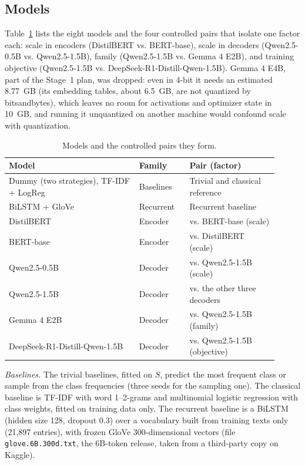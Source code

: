 \subsection{Models}
Table~\ref{tab:taxonomy2} lists the eight models and the four controlled pairs that isolate one factor each: scale in encoders (DistilBERT vs. BERT-base), scale in decoders (Qwen2.5-0.5B vs. Qwen2.5-1.5B), family (Qwen2.5-1.5B vs. Gemma 4 E2B), and training objective (Qwen2.5-1.5B vs. DeepSeek-R1-Distill-Qwen-1.5B). Gemma 4 E4B, part of the Stage~1 plan, was dropped: even in 4-bit it needs an estimated 8.77~GB (its embedding tables, about 6.5~GB, are not quantized by bitsandbytes), which leaves no room for activations and optimizer state in 10~GB, and running it unquantized on another machine would confound scale with quantization.

\begin{table}[htbp]
\centering
\caption{Models and the controlled pairs they form.}
\label{tab:taxonomy2}
\footnotesize
\begin{tabular}{@{}>{\raggedright\arraybackslash}p{0.44\linewidth}>{\raggedright\arraybackslash}p{0.17\linewidth}>{\raggedright\arraybackslash}p{0.3\linewidth}@{}}
\toprule
\textbf{Model} & \textbf{Family} & \textbf{Pair (factor)} \\
\midrule
Dummy (two strategies), TF-IDF + LogReg & Baselines & Trivial and classical reference \\
BiLSTM + GloVe & Recurrent & Recurrent baseline \\
DistilBERT & Encoder & vs. BERT-base (scale) \\
BERT-base & Encoder & vs. DistilBERT (scale) \\
Qwen2.5-0.5B & Decoder & vs. Qwen2.5-1.5B (scale) \\
Qwen2.5-1.5B & Decoder & vs. the other three decoders \\
Gemma 4 E2B & Decoder & vs. Qwen2.5-1.5B (family) \\
DeepSeek-R1-Distill-Qwen-1.5B & Decoder & vs. Qwen2.5-1.5B (objective) \\
\bottomrule
\end{tabular}
\end{table}

\textit{Baselines.} The trivial baselines, fitted on $S$, predict the most frequent class or sample from the class frequencies (three seeds for the sampling one). The classical baseline is TF-IDF with word 1--2-grams and multinomial logistic regression with class weights, fitted on training data only. The recurrent baseline is a BiLSTM (hidden size 128, dropout 0.3) over a vocabulary built from training texts only (21,897 entries), with frozen GloVe 300-dimensional vectors \cite{pennington2014glove} (file \texttt{glove.6B.300d.txt}, the 6B-token release, taken from a third-party copy on Kaggle).

